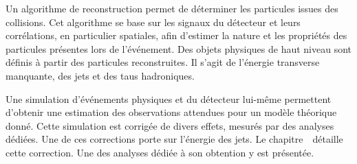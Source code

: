 \par
Un algorithme de reconstruction permet de déterminer les particules issues des collisions.
Cet algorithme se base sur les signaux du détecteur et leurs corrélations, en particulier spatiales, afin d'estimer la nature et les propriétés des particules présentes lors de l'événement.
Des objets physiques de haut niveau sont définis à partir des particules reconstruites.
Il s'agit de l'énergie transverse manquante, des jets et des taus hadroniques.
\par
Une simulation d'événements physiques et du détecteur lui-même permettent d'obtenir une estimation des observations attendues pour un modèle théorique donné.
Cette simulation est corrigée de divers effets, mesurés par des analyses dédiées.
Une de ces corrections porte sur l'énergie des jets.
Le chapitre~\ détaille cette correction.
Une des analyses dédiée à son obtention y est présentée.